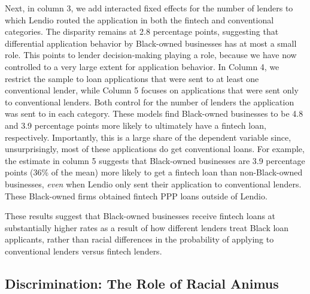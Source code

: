 \documentclass[11pt]{article}
\begin{document}
Next, in column 3, we add interacted fixed effects for the number of lenders to which Lendio routed the application in both the fintech and conventional categories. The disparity remains at 2.8 percentage points, suggesting that differential application behavior by Black-owned businesses has at most a small role. This points to lender decision-making playing a role, because we have now controlled to a very large extent for application behavior. In Column 4, we restrict the sample to loan applications that were sent to at least one conventional lender, while Column 5 focuses on applications that were sent only to conventional lenders. Both control for the number of lenders the application was sent to in each category. These models find Black-owned businesses to be 4.8 and 3.9 percentage points more likely to ultimately have a fintech loan, respectively. Importantly, this is a large share of the dependent variable since, unsurprisingly, most of these applications do get conventional loans. For example, the estimate in column 5 suggests that Black-owned businesses are 3.9 percentage points (36\% of the mean) more likely to get a fintech loan than non-Black-owned businesses, \textit{even} when Lendio only sent their application to conventional lenders. These Black-owned firms obtained fintech PPP loans outside of Lendio. 
 
These results suggest that Black-owned businesses receive fintech loans at substantially higher rates as a result of how different lenders treat Black loan applicants, rather than racial differences in the probability of applying to conventional lenders versus fintech lenders.

\subsection{Discrimination: The Role of Racial Animus} \label{sec:disc}
\end{document}
